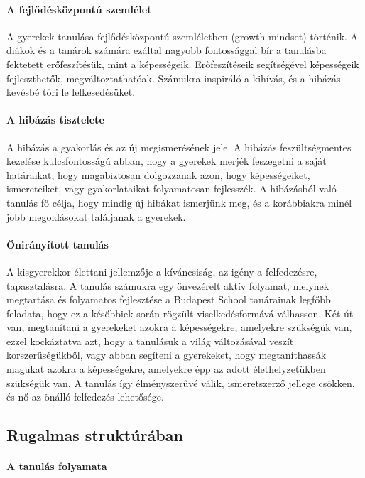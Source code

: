 \paragraph{A fejlődésközpontú szemlélet}

A gyerekek tanulása fejlődésközpontú szemléletben (growth mindset)
történik. A diákok és a tanárok számára ezáltal nagyobb fontossággal
bír a tanulásba fektetett erőfeszítésük, mint a képességeik.
Erőfeszítéseik segítségével képességeik fejleszthetők,
megváltoztathatóak. Számukra inspiráló a kihívás, és a hibázás kevésbé
töri le lelkesedésüket.

\paragraph{A hibázás tisztelete}

A hibázás a gyakorlás és az új megismerésének jele. A hibázás
feszültségmentes kezelése kulcsfontosságú abban, hogy a gyerekek merjék
feszegetni a saját határaikat, hogy magabiztosan dolgozzanak azon, hogy
képességeiket, ismereteiket, vagy gyakorlataikat folyamatosan
fejlesszék. A hibázásból való tanulás fő célja, hogy mindig új hibákat
ismerjünk meg, és a korábbiakra minél jobb megoldásokat találjanak a
gyerekek.

\paragraph{Önirányított
      tanulás}

A kisgyerekkor élettani jellemzője a kíváncsiság, az igény a
felfedezésre, tapasztalásra. A tanulás számukra egy önvezérelt aktív
folyamat, melynek megtartása és folyamatos fejlesztése a Budapest School
tanárainak legfőbb feladata, hogy ez a későbbiek során rögzült
viselkedésformává válhasson. Két út van, megtanítani a gyerekeket azokra
a képességekre, amelyekre szükségük van, ezzel kockáztatva azt, hogy a
tanulásuk a világ változásával veszít korszerűségükből, vagy abban
segíteni a gyerekeket, hogy megtaníthassák magukat azokra a
képességekre, amelyekre épp az adott élethelyzetükben szükségük van. A
tanulás így élményszerűvé válik, ismeretszerző jellege csökken, és nő az
önálló felfedezés lehetősége.

\subsection{Rugalmas struktúrában}
\paragraph{A tanulás folyamata}

